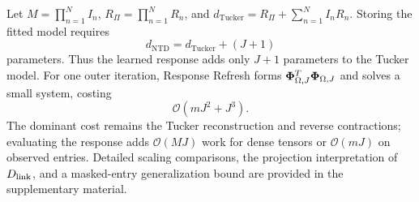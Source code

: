 Let $M=\prod_{n=1}^{N}I_n$, $R_\Pi=\prod_{n=1}^{N}R_n$, and
$d_{\mathrm{Tucker}}=R_\Pi+\sum_{n=1}^{N}I_nR_n$. Storing the fitted model
requires
\begin{equation}
  d_{\mathrm{NTD}}=d_{\mathrm{Tucker}}+(J+1)
\end{equation}
parameters. Thus the learned response adds only $J+1$ parameters to the Tucker
model. For one outer iteration, Response Refresh forms
$\boldsymbol{\Phi}_{\Omega,J}^{T}\boldsymbol{\Phi}_{\Omega,J}$ and solves a small system, costing
\begin{equation}
  \mathcal{O}\!\left(mJ^2+J^3\right).
\end{equation}
The dominant cost remains the Tucker reconstruction and reverse contractions;
evaluating the response adds $\mathcal{O}(MJ)$ work for dense tensors or
$\mathcal{O}(mJ)$ on observed entries. Detailed scaling comparisons, the
projection interpretation of $D_{\mathrm{link}}$, and a masked-entry generalization bound
are provided in the supplementary material.
